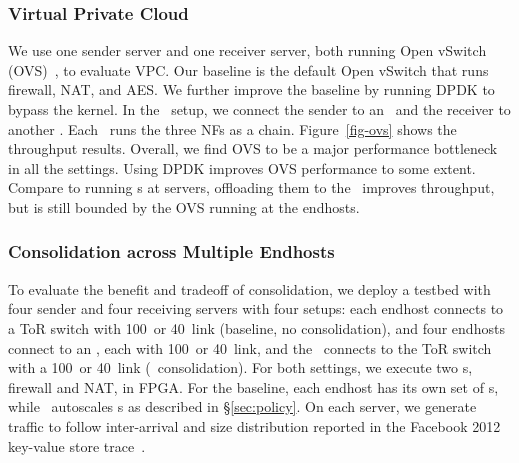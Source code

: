 \subsubsection{Virtual Private Cloud}
We use one sender server and one receiver server, both running Open vSwitch (OVS)~\cite{ovs-nsdi15}, to evaluate VPC.
Our baseline is the default Open vSwitch that runs firewall, NAT, and AES.
We further improve the baseline by running DPDK to bypass the kernel.
In the \snic\ setup, we connect the sender to an \snic\ and the receiver to another \snic.
Each \snic\ runs the three NFs as a chain.
Figure~\ref{fig-ovs} shows the throughput results.
Overall, we find OVS to be a major performance bottleneck in all the settings. Using DPDK improves OVS performance to some extent.
Compare to running \nt{}s at servers, offloading them to the \snic\ improves throughput, but is still bounded by the OVS running at the endhosts.

\subsubsection{Consolidation across Multiple Endhosts}
To evaluate the benefit and tradeoff of consolidation, we deploy a testbed with four sender and four receiving servers with four setups:
each endhost connects to a ToR switch with 100\Gbps\ or 40\Gbps\ link (baseline, no consolidation), and four endhosts connect to an \snic, each with 100\Gbps\ or 40\Gbps\ link, and the \snic\ connects to the ToR switch with a 100\Gbps\ or 40\Gbps\ link (\snic\ consolidation).
For both settings, we execute two \nt{}s, firewall and NAT, in FPGA. 
For the baseline, each endhost has its own set of \nt{}s, while %
\snic\ autoscales \nt{}s as described in \S\ref{sec:policy}.
On each server, we generate traffic to follow inter-arrival and size distribution reported in the Facebook 2012 key-value store trace~\cite{Atikoglu12-SIGMETRICS}.

